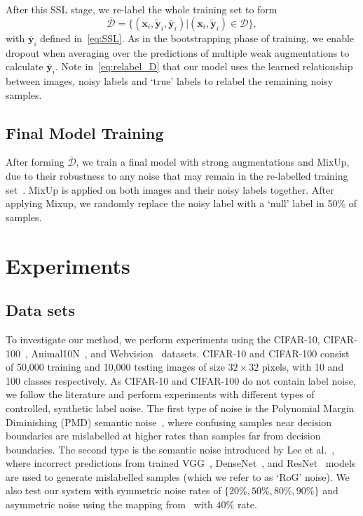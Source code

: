 \documentclass[10pt,twocolumn,letterpaper]{article}
\begin{document}
After this SSL stage, we re-label the whole training set to form
\begin{equation}
\bar{\mathcal{D}} = \{(\mathbf{x}_i, \tilde{\mathbf{y}}_i, \bar{\mathbf{y}}_i) | (\mathbf{x}_i, \tilde{\mathbf{y}}_i)\in \mathcal{D}\},
\label{eq:relabel_D}
\end{equation}
with $\bar{\mathbf{y}}_i$ defined in~\eqref{eq:SSL}. As in the bootstrapping phase of training, we enable dropout when averaging over the predictions of multiple weak augmentations to calculate $\bar{\mathbf{y}}_i$. Note in~\eqref{eq:relabel_D} that our model uses the learned relationship between images, noisy labels and `true' labels to relabel the remaining noisy samples.

\subsection{Final Model Training}

After forming $\bar{\mathcal{D}}$, we train a final model with strong augmentations and MixUp, due to their robustness to any noise that may remain in the re-labelled training set~\cite{arazo2019unsupervised, li2020dividemix}. MixUp is applied on both images and their noisy labels together. After applying Mixup, we randomly replace the noisy label with a `null' label in 50\% of samples.

\section{Experiments}


\subsection{Data sets}

To investigate our method, we perform experiments using the CIFAR-10, CIFAR-100~\cite{krizhevsky2009learning}, Animal10N~\cite{song2019selfie}, 
and Webvision~\cite{li2017webvision} datasets.
CIFAR-10 and CIFAR-100 consist of 50,000 training and 10,000 testing images of size $32 \times 32$ pixels, with 10 and 100 classes respectively. As CIFAR-10 and CIFAR-100 do not contain label noise, we follow the literature and perform experiments with different types of controlled, synthetic label noise. The first type of noise is the Polynomial Margin Diminishing (PMD) semantic noise~\cite{zhang2020learning}, where confusing samples near decision boundaries are mislabelled at higher rates than samples far from decision boundaries. The second type is the semantic noise introduced by Lee et al.~\cite{lee2019robust}, where incorrect predictions from trained VGG~\citep{simonyan2014very}, DenseNet~\cite{huang2017densely}, and ResNet~\cite{he2016identity} models are used to generate mislabelled samples (which we refer to as `RoG' noise). We also test our system with symmetric noise rates of $\{20\%, 50\%, 80\%, 90\%\}$ and asymmetric noise using the mapping from~\citep{li2020dividemix, patrini2017making} with $40\%$ rate.
\end{document}
